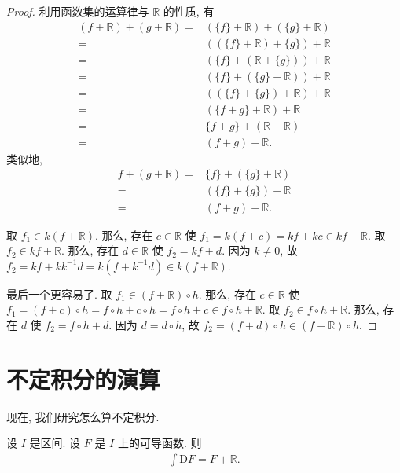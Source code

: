 \begin{proof}
    利用函数集的运算律与 $\mathbb{R}$ 的性质, 有
    \begin{align*}
        (f + \mathbb{R}) + (g + \mathbb{R})
        = {} & (\{ f \} + \mathbb{R}) + (\{ g \} + \mathbb{R}) \\
        = {} & ((\{ f \} + \mathbb{R}) + \{ g \}) + \mathbb{R} \\
        = {} & (\{ f \} + (\mathbb{R} + \{ g \})) + \mathbb{R} \\
        = {} & (\{ f \} + (\{ g \} + \mathbb{R})) + \mathbb{R} \\
        = {} & ((\{ f \} + \{ g \}) + \mathbb{R}) + \mathbb{R} \\
        = {} & (\{ f + g \} + \mathbb{R}) + \mathbb{R}         \\
        = {} & \{ f + g \} + (\mathbb{R} + \mathbb{R})         \\
        = {} & (f + g) + \mathbb{R}.
    \end{align*}
    类似地,
    \begin{align*}
        f + (g + \mathbb{R})
        = {} & \{ f \} + (\{ g \} + \mathbb{R}) \\
        = {} & (\{ f \} + \{ g \}) + \mathbb{R} \\
        = {} & (f + g) + \mathbb{R}.
    \end{align*}

    取 $f_1 \in k(f + \mathbb{R})$.
    那么, 存在 $c \in \mathbb{R}$ 使
    $f_1 = k(f + c) = kf + kc \in kf + \mathbb{R}$.
    取 $f_2 \in kf + \mathbb{R}$.
    那么, 存在 $d \in \mathbb{R}$ 使 $f_2 = kf + d$.
    因为 $k \neq 0$,
    故 $f_2 = kf + kk^{-1}d = k(f + k^{-1}d) \in k(f + \mathbb{R})$.

    最后一个更容易了.
    取 $f_1 \in (f + \mathbb{R}) \circ h$.
    那么, 存在 $c \in \mathbb{R}$ 使
    $f_1 = (f + c) \circ h = f \circ h + c \circ h = f \circ h + c \in f \circ h + \mathbb{R}$.
    取 $f_2 \in f \circ h + \mathbb{R}$.
    那么, 存在 $d$ 使 $f_2 = f \circ h + d$.
    因为 $d = d \circ h$,
    故 $f_2 = (f + d) \circ h \in (f + \mathbb{R}) \circ h$.
\end{proof}

\section{不定积分的演算}

现在, 我们研究怎么算不定积分.

\begin{theorem}
    设 $I$ 是区间.
    设 $F$ 是 $I$ 上的可导函数.
    则
    \begin{align*}
        \int {\mathrm{D}F} = F + \mathbb{R}.
    \end{align*}
\end{theorem}

